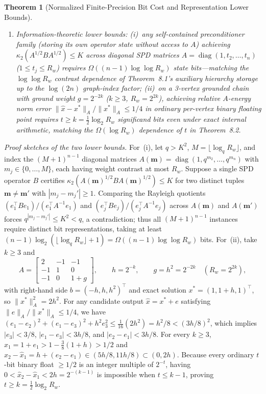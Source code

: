\documentclass[10pt]{article}
\newtheorem{theorem}{Theorem}
\begin{document}
\begin{theorem}[Normalized Finite-Precision Bit Cost and Representation Lower Bounds]
\begin{enumerate}
  \item \emph{Information-theoretic lower bounds:} (i)~any \emph{self-contained} preconditioner family (storing its own operator state without access to $A$) achieving $\kappa_2(A^{1/2} B A^{1/2}) \le K$ across diagonal SPD matrices $A = \operatorname{diag}(1, t_2, \dots, t_n)$ ($1 \le t_j \le R_w$) requires $\Omega((n-1)\log\log R_w)$ state bits---matching the $\log\log R_w$ contrast dependence of Theorem~8.1's auxiliary hierarchy storage up to the $\log(2n)$ graph-index factor; (ii)~on a 3-vertex grounded chain with ground weight $g = 2^{-2k}$ ($k \ge 3$, $R_w = 2^{2k}$), achieving relative $A$-energy norm error $\|\hat{x} - x^*\|_A / \|x^*\|_A \le 1/4$ in ordinary per-vertex binary floating point requires $t \ge k = \frac{1}{2}\log_2 R_w$ significand bits even under exact internal arithmetic, matching the $\Omega(\log R_w)$ dependence of $t$ in Theorem~8.2.
\end{enumerate}
\end{theorem}

\noindent\emph{Proof sketches of the two lower bounds.} For~(i), let $q > K^2$, $M = \lfloor\log_q R_w\rfloor$, and index the $(M+1)^{n-1}$ diagonal matrices $A(\mathbf{m}) = \operatorname{diag}(1, q^{m_2}, \dots, q^{m_n})$ with $m_j \in \{0,\dots,M\}$, each having weight contrast at most $R_w$. Suppose a single SPD operator $B$ certifies $\kappa_2(A(\mathbf{m})^{1/2} B A(\mathbf{m})^{1/2}) \le K$ for two distinct tuples $\mathbf{m} \neq \mathbf{m}'$ with $|m_j - m_j'| \ge 1$. Comparing the Rayleigh quotients $(e_1^\top B e_1)/(e_1^\top A^{-1} e_1)$ and $(e_j^\top B e_j)/(e_j^\top A^{-1} e_j)$ across $A(\mathbf{m})$ and $A(\mathbf{m}')$ forces $q^{|m_j - m_j'|} \le K^2 < q$, a contradiction; thus all $(M+1)^{n-1}$ instances require distinct bit representations, taking at least $(n-1)\log_2(\lfloor\log_q R_w\rfloor + 1) = \Omega((n-1)\log\log R_w)$ bits. For~(ii), take $k \ge 3$ and
\[
  A = \begin{bmatrix}2 & -1 & -1\\ -1 & 1 & 0\\ -1 & 0 & 1+g\end{bmatrix}, \qquad
  h = 2^{-k}, \qquad g = h^2 = 2^{-2k} \quad (R_w = 2^{2k}),
\]
with right-hand side $b = (-h, h, h^2)^\top$ and exact solution $x^* = (1, 1+h, 1)^\top$, so $\|x^*\|_A^2 = 2h^2$. For any candidate output $\hat{x} = x^* + e$ satisfying $\|e\|_A/\|x^*\|_A \le 1/4$, we have $(e_1 - e_2)^2 + (e_1 - e_3)^2 + h^2 e_3^2 \le \frac{1}{16}(2h^2) = h^2/8 < (3h/8)^2$, which implies $|e_3| < 3/8$, $|e_1 - e_3| < 3h/8$, and $|e_2 - e_1| < 3h/8$. For every $k \ge 3$, $\hat{x}_1 = 1 + e_1 > 1 - \frac{3}{8}(1+h) > 1/2$ and $\hat{x}_2 - \hat{x}_1 = h + (e_2 - e_1) \in (5h/8, 11h/8) \subset (0, 2h)$. Because every ordinary $t$-bit binary float $\ge 1/2$ is an integer multiple of $2^{-t}$, having $0 < \hat{x}_2 - \hat{x}_1 < 2h = 2^{-(k-1)}$ is impossible when $t \le k - 1$, proving $t \ge k = \frac{1}{2}\log_2 R_w$.
\end{document}
